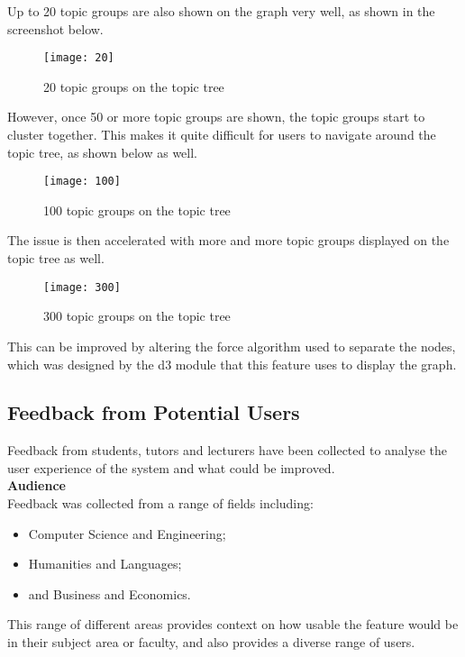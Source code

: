 Up to 20 topic groups are also shown on the graph very well, as shown in the screenshot below.
\begin{figure}[h!]
    \centering
    \texttt{[image: 20]}
    \caption{20 topic groups on the topic tree}
\end{figure}

However, once 50 or more topic groups are shown, the topic groups start to cluster together. This makes it quite difficult for users to navigate around the topic tree, as shown below as well.

\begin{figure}[h!]
    \centering
    \texttt{[image: 100]}
    \caption{100 topic groups on the topic tree}
\end{figure}

The issue is then accelerated with more and more topic groups displayed on the topic tree as well.

\begin{figure}[h!]
    \centering
    \texttt{[image: 300]}
    \caption{300 topic groups on the topic tree}
\end{figure}

This can be improved by altering the force algorithm used to separate the nodes, which was designed by the d3 module that this feature uses to display the graph. 
\newpage

\subsection{Feedback from Potential Users}
Feedback from students, tutors and lecturers have been collected to analyse the user experience of the system and what could be improved. \\

\textbf{Audience} \\

Feedback was collected from a range of fields including:\\
\begin{itemize}
    \item Computer Science and Engineering;
    \item Humanities and Languages;
    \item and Business and Economics.
\end{itemize}

This range of different areas provides context on how usable the feature would be in their subject area or faculty, and also provides a diverse range of users.\\

